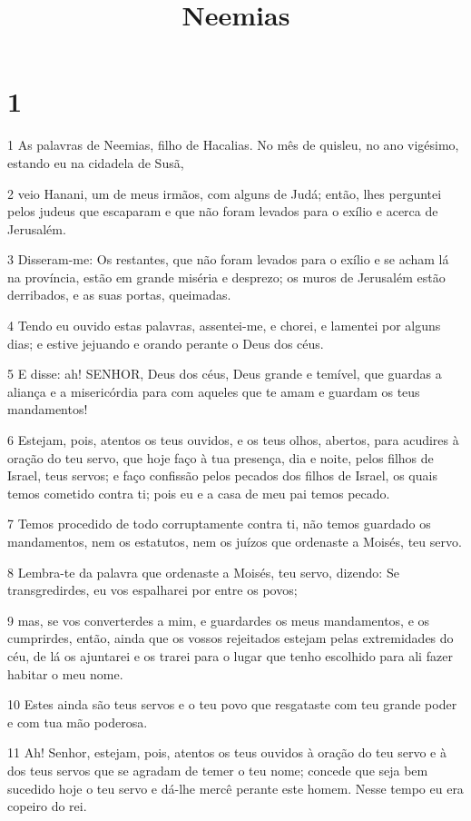 

\title{Neemias}


\chapter{1}

\par 1 As palavras de Neemias, filho de Hacalias. No mês de quisleu, no ano vigésimo, estando eu na cidadela de Susã,
\par 2 veio Hanani, um de meus irmãos, com alguns de Judá; então, lhes perguntei pelos judeus que escaparam e que não foram levados para o exílio e acerca de Jerusalém.
\par 3 Disseram-me: Os restantes, que não foram levados para o exílio e se acham lá na província, estão em grande miséria e desprezo; os muros de Jerusalém estão derribados, e as suas portas, queimadas.
\par 4 Tendo eu ouvido estas palavras, assentei-me, e chorei, e lamentei por alguns dias; e estive jejuando e orando perante o Deus dos céus.
\par 5 E disse: ah! SENHOR, Deus dos céus, Deus grande e temível, que guardas a aliança e a misericórdia para com aqueles que te amam e guardam os teus mandamentos!
\par 6 Estejam, pois, atentos os teus ouvidos, e os teus olhos, abertos, para acudires à oração do teu servo, que hoje faço à tua presença, dia e noite, pelos filhos de Israel, teus servos; e faço confissão pelos pecados dos filhos de Israel, os quais temos cometido contra ti; pois eu e a casa de meu pai temos pecado.
\par 7 Temos procedido de todo corruptamente contra ti, não temos guardado os mandamentos, nem os estatutos, nem os juízos que ordenaste a Moisés, teu servo.
\par 8 Lembra-te da palavra que ordenaste a Moisés, teu servo, dizendo: Se transgredirdes, eu vos espalharei por entre os povos;
\par 9 mas, se vos converterdes a mim, e guardardes os meus mandamentos, e os cumprirdes, então, ainda que os vossos rejeitados estejam pelas extremidades do céu, de lá os ajuntarei e os trarei para o lugar que tenho escolhido para ali fazer habitar o meu nome.
\par 10 Estes ainda são teus servos e o teu povo que resgataste com teu grande poder e com tua mão poderosa.
\par 11 Ah! Senhor, estejam, pois, atentos os teus ouvidos à oração do teu servo e à dos teus servos que se agradam de temer o teu nome; concede que seja bem sucedido hoje o teu servo e dá-lhe mercê perante este homem. Nesse tempo eu era copeiro do rei.

